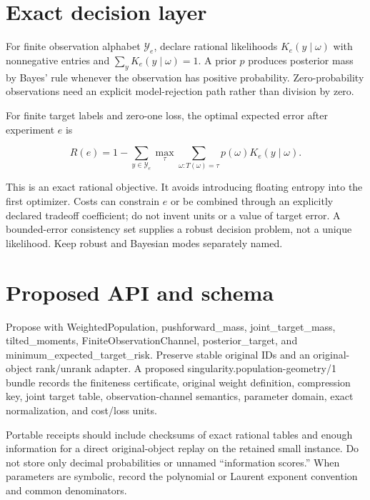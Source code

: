 \documentclass[
  11pt,
  a4paper,
]{report}
\let\nxtexttt\texttt
\renewcommand{\texttt}[1]{\nxtexttt{\seqsplit{#1}}}
\begin{document}
\hypertarget{exact-decision-layer}{%
\section{Exact decision layer}\label{exact-decision-layer}}

For finite observation alphabet \(\mathcal Y_e\), declare rational
likelihoods \(K_e(y\mid\omega)\) with nonnegative entries and
\(\sum_yK_e(y\mid\omega)=1\). A prior \(p\) produces posterior mass by
Bayes' rule whenever the observation has positive probability.
Zero-probability observations need an explicit model-rejection path
rather than division by zero.

For finite target labels and zero-one loss, the optimal expected error
after experiment \(e\) is

\[
R(e)=1-\sum_{y\in\mathcal Y_e}\max_\tau
\sum_{\omega:T(\omega)=\tau}p(\omega)K_e(y\mid\omega).
\]

This is an exact rational objective. It avoids introducing floating
entropy into the first optimizer. Costs can constrain \(e\) or be
combined through an explicitly declared tradeoff coefficient; do not
invent units or a value of target error. A bounded-error consistency set
supplies a robust decision problem, not a unique likelihood. Keep robust
and Bayesian modes separately named.

\hypertarget{proposed-api-and-schema}{%
\section{Proposed API and schema}\label{proposed-api-and-schema}}

Propose \texttt{src/singularity/population\_geometry.py} with
WeightedPopulation, pushforward\_mass, joint\_target\_mass,
tilted\_moments, FiniteObservationChannel, posterior\_target, and
minimum\_expected\_target\_risk. Preserve stable original IDs and an
original-object rank/unrank adapter. A proposed
singularity.population-geometry/1 bundle records the finiteness
certificate, original weight definition, compression key, joint target
table, observation-channel semantics, parameter domain, exact
normalization, and cost/loss units.

Portable receipts should include checksums of exact rational tables and
enough information for a direct original-object replay on the retained
small instance. Do not store only decimal probabilities or unnamed
``information scores.'' When parameters are symbolic, record the
polynomial or Laurent exponent convention and common denominators.
\end{document}
